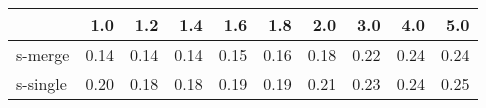 \begin{tabular}{lrrrrrrrrr}
\toprule
{} &  1.0 &  1.2 &  1.4 &  1.6 &  1.8 &  2.0 &  3.0 &  4.0 &  5.0 \\
\midrule
s-merge  & 0.14 & 0.14 & 0.14 & 0.15 & 0.16 & 0.18 & 0.22 & 0.24 & 0.24 \\
s-single & 0.20 & 0.18 & 0.18 & 0.19 & 0.19 & 0.21 & 0.23 & 0.24 & 0.25 \\
\bottomrule
\end{tabular}

